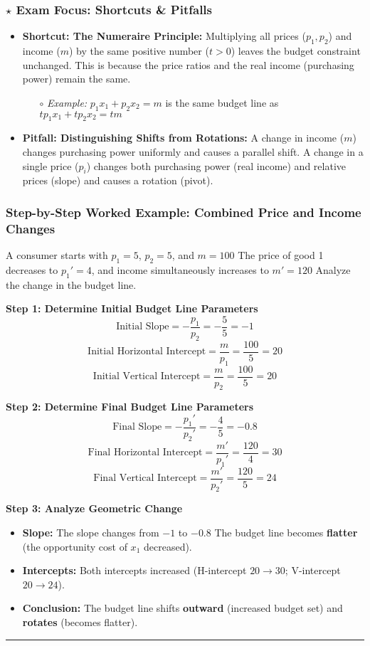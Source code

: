 \documentclass{article}
\begin{document}
\subsubsection*{$\star$ Exam Focus: Shortcuts \& Pitfalls}
\begin{itemize}
    \item \textbf{Shortcut: The Numeraire Principle:} Multiplying all prices ($p_1, p_2$) and income ($m$) by the same positive number ($t > 0$) leaves the budget constraint unchanged. This is because the price ratios and the real income (purchasing power) remain the same.
    \begin{itemize}
        \item[$\circ$] \textit{Example:} $p_1 x_1 + p_2 x_2 = m$ is the same budget line as $tp_1 x_1 + tp_2 x_2 = tm$
    \end{itemize}
    \item \textbf{Pitfall: Distinguishing Shifts from Rotations:} A change in income ($m$) changes purchasing power uniformly and causes a parallel shift. A change in a single price ($p_i$) changes both purchasing power (real income) and relative prices (slope) and causes a rotation (pivot).
\end{itemize}

\subsubsection*{Step-by-Step Worked Example: Combined Price and Income Changes}

A consumer starts with $p_1=5$, $p_2=5$, and $m=100$ The price of good 1 decreases to $p_1'=4$, and income simultaneously increases to $m'=120$ Analyze the change in the budget line.

\textbf{Step 1: Determine Initial Budget Line Parameters} \[ \text{Initial Slope} = -\frac{p_1}{p_2} = -\frac{5}{5} = -1 \] \[ \text{Initial Horizontal Intercept} = \frac{m}{p_1} = \frac{100}{5} = 20 \] \[ \text{Initial Vertical Intercept} = \frac{m}{p_2} = \frac{100}{5} = 20 \]

\textbf{Step 2: Determine Final Budget Line Parameters} \[ \text{Final Slope} = -\frac{p_1'}{p_2'} = -\frac{4}{5} = -0.8 \] \[ \text{Final Horizontal Intercept} = \frac{m'}{p_1'} = \frac{120}{4} = 30 \] \[ \text{Final Vertical Intercept} = \frac{m'}{p_2'} = \frac{120}{5} = 24 \]

\textbf{Step 3: Analyze Geometric Change}
\begin{itemize}
    \item \textbf{Slope:} The slope changes from $-1$ to $-0.8$ The budget line becomes \textbf{flatter} (the opportunity cost of $x_1$ decreased).
    \item \textbf{Intercepts:} Both intercepts increased (H-intercept $20 \to 30$; V-intercept $20 \to 24$).
    \item \textbf{Conclusion:} The budget line shifts \textbf{outward} (increased budget set) and \textbf{rotates} (becomes flatter).
\end{itemize}
\noindent\rule{\linewidth}{0.4pt}
\end{document}
